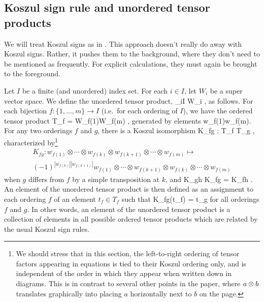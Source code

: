 \subsection{Koszul sign rule and unordered tensor products} \label{koszul_signs}

We will treat Koszul signs as in \cite[Section 1.2]{deligne1999}.
This approach doesn't really do away with Koszul signs.
Rather, it pushes them to the background, where they don't need to be mentioned as frequently.
For explicit calculations, they must again be brought to the foreground.

Let $I$ be a finite (and unordered) index set.
For each $i\in I$, let $W_i$ be a super vector space.
We define the unordered tensor product,
\be
	\bigotimes_{i\in I} W_i ,
\ee
as follows.
For each bijection $f: \{1, \ldots,m\} \to I$ (i.e.\ for each ordering of $I$),
we have the ordered tensor product
\be
	T_f = W_{f(1)}\otimes\cdots\otimes W_{f(m)} ,
\ee
generated by elements
\be
	w_{f(1)}\otimes\cdots\otimes w_{f(m)}.
\ee
For any two orderings $f$ and $g$, there is a Koszul isomorphism
\be
	K_{fg} : T_f \to T_g ,
\ee
characterized by\footnote{
We should stress that in this section, 
the left-to-right ordering of tensor factors appearing in equations is tied to their Koszul ordering only, and
is independent of the order in which they appear when written down in diagrams. 
This is in contrast to several other points in the 
paper, where $a\otimes b$ translates graphically into placing $a$ horizontally next to $b$ on the page.
} 
\begin{multline}
	K_{fg} : w_{f(1)}\otimes\cdots\otimes w_{f(k)} \otimes w_{f(k+1)} \otimes \cdots \otimes w_{f(m)} \mapsto \\
				(-1)^{|w_{f(k)}||w_{f(k+1)}|} w_{f(1)}\otimes\cdots\otimes w_{f(k+1)} \otimes w_{f(k)} \otimes \cdots \otimes w_{f(m)}
\end{multline}
when $g$ differs from $f$ by a simple transposition at $k$, and
\be
	K_{gh} \circ K_{fg} = K_{fh} .
\ee
An element of the unordered tensor product is then defined as an assignment to each ordering $f$ of an element $t_f\in T_f$
such that
\be
	K_{fg}(t_f) = t_g
\ee
for all orderings $f$ and $g$.
In other words, an element of the unordered tensor product is a collection of elements in all 
possible ordered tensor products which are related by the usual Koszul sign rules.



